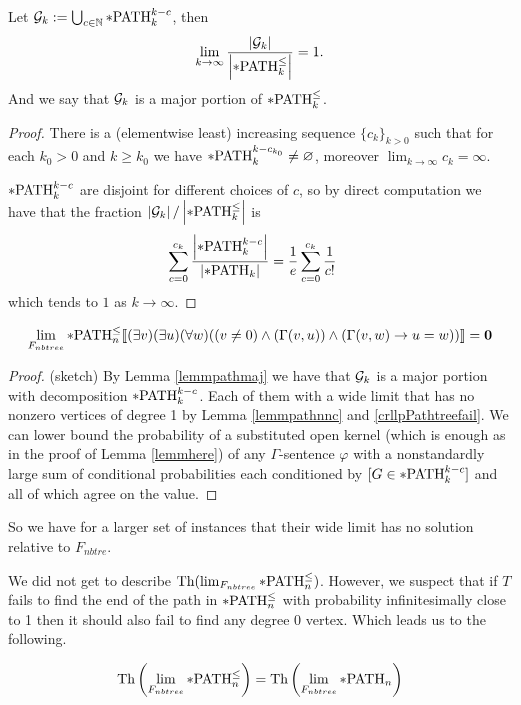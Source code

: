 \begin{lemm}\label{lemmpathmaj}
Let $\mathcal{G}_k:=\bigcup_{c\in\mathbb{N}}*\text{PATH}^{k-c}_k$, then
\[\lim_{k\to\infty}\frac{\left|{\mathcal{G}_k}\right|}{\left|{*\text{PATH}^\leq_k}\right|}=1.\]
And we say that $\mathcal{G}_k$ is a major portion of $*\text{PATH}^\leq_k$.
\end{lemm}
\begin{proof}
There is a (elementwise least) increasing sequence $\{c_k\}_{k>0}$ such that for each $k_0>0$ and $k\geq k_0$ we have $*\text{PATH}_k^{k-{c_{k_0}}}\neq \varnothing$, moreover $\lim_{k\to\infty} c_k = \infty$.

$*\text{PATH}^{k-c}_k$ are disjoint for different choices of $c$, so by direct computation we have that the fraction $\left|{\mathcal{G}_k}\right|/\left|{*\text{PATH}^\leq_k}\right|$ is
\begin{align}
\sum_{c=0}^{c_k} \frac{\left|{*\text{PATH}_k^{k-c}}\right|}{\left|{*\text{PATH}_k}\right|}&=\frac{1}{e}\sum_{c=0}^{c_k}\frac{1}{c!}
\end{align}
which tends to $1$ as $k\to\infty$.
\end{proof}

\begin{thrm}
\[\lim_{F_{nbtree}}*\text{PATH}^\leq_n\llbracket(\exists v)(\exists u)(\forall w)((v\not=0)\land (\Gamma(v,u)) \land(\Gamma(v,w) \to u=w))\rrbracket=\textbf{0}\]
\end{thrm}
\begin{proof}(sketch)
By Lemma \ref{lemmpathmaj} we have that $\mathcal{G}_k$ is a major portion with decomposition $*\text{PATH}_k^{k-c}$. Each of them with a wide limit that has no nonzero vertices of degree 1 by Lemma \ref{lemmpathnnc} and \ref{crllpPathtreefail}. We can lower bound the probability of a substituted open kernel (which is enough as in the proof of Lemma \ref{lemmhere}) of any $\Gamma$-sentence $\varphi$ with a nonstandardly large sum of conditional probabilities each conditioned by $[G\in*\text{PATH}_k^{k-c}]$ and all of which agree on the value.
\end{proof}

So we have for a larger set of instances that their wide limit has no solution relative to $F_{nbtre}$.

We did not get to describe $\text{Th}(\lim_{F_{nbtree}}*\text{PATH}^\leq_n)$. However, we suspect that if $T$ fails to find the end of the path in $*\text{PATH}^\leq_n$ with probability infinitesimally close to 1 then it should also fail to find any degree 0 vertex. Which leads us to the following.

\begin{conj}
\[\text{Th}\left(\lim_{F_{nbtree}}*\text{PATH}^\leq_n\right)=\text{Th}\left(\lim_{F_{nbtree}}*\text{PATH}_n\right)\]
\end{conj}



